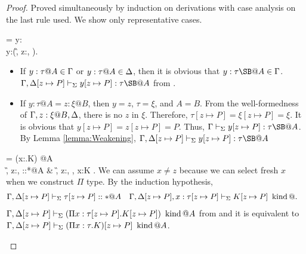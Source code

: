 \begin{proof}
    Proved simultaneously by induction on derivations with case analysis on the last rule used.
    We show only representative cases.
    {
        \newcommand{\SB}{[z \mapsto P]}
        \newcommand{\GG}{\G}
        \newcommand{\GGV}{\G \V}

        \begin{rneqncase}{\TVar{}}{
                 = y:\tau@A\\
                y:\tau@A \in (\G, z:\xi@B, \D).
                }
                \begin{itemize}
                    \item If $y:\tau@A \in \G$ or $y:\tau@A \in \D$, then it is obvious that $y:\tau\SB@A \in \GG$.
                        \(\G,\D\SB \V y\SB:\tau\SB@A\) from \TVar.

                    \item If $y:\tau@A = z:\xi@B$, then
                        $y = z$, $\tau = \xi$, and $A = B$.
                        From the well-formedness of \( \G, z:\xi@B,\D \), there is no $z$ in $\xi$.
                        Therefore, $\tau\SB = \xi\SB = \xi$.
                        It is obvious that $y\SB = z\SB = P$.
                        Thus, $\G \V y\SB : \tau\SB@A$.
                        By Lemma \ref{lemma:Weakening}, $\G,\D\SB \V y\SB : \tau\SB@A$

                \end{itemize}
        \end{rneqncase}

        \begin{rneqncase}{\WPi{}}{
                 =  (\Pi x:\tau.K) \iskind @A\\
                \G, z:\xi@B, \D \V \tau::*@A & \G, z:\xi@B, \D, x:\tau \V K \iskind@A.
                }
                We can assume $x \neq z$ because we can select fresh $x$ when we construct $\Pi$ type.
                By the induction hypothesis,
                \begin{align*}
                    & \G,\D\SB \V \tau\SB::*@A &  & \G,\D\SB, x:\tau\SB \V K\SB \iskind@.
                \end{align*}
                $\G,\D\SB \V (\Pi x:\tau\SB.K\SB) \iskind @A$ from \WAbs{} and
                it is equivalent to $\G,\D\SB \V (\Pi x:\tau.K)\SB \iskind @A$.
        \end{rneqncase}

}
\end{proof}

